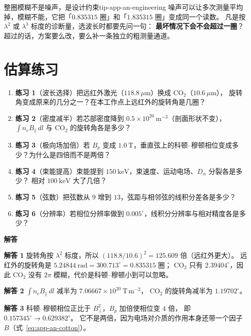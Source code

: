 \begin{tip}{整圈模糊不是噪声，是设计约束}{tip-app-an-engineering}
噪声可以让多次测量平均掉，模糊不能，它把「$0.835315$ 圈」和「$1.835315$ 圈」变成同一个读数。
凡是按 $\lambda^2$ 或 $\lambda^3$ 标度的诊断量，选波长时都要先问一句：
\textbf{最坏情况下会不会超过一圈}？
超过的话，方案要么改，要么补一条独立的粗测量通道。
\end{tip}


\section{估算练习}
\label{sec:app-an-problems}

\begin{enumerate}
\item \textbf{练习 1}（波长选择）把远红外激光（$118.8\ \mu\mathrm{m}$）换成 CO$_2$（$10.6\ \mu\mathrm{m}$），
旋转角变成原来的几分之一？在本工作点上远红外的旋转角是几圈？
\item \textbf{练习 2}（密度减半）若芯部密度降到 $0.5\times10^{20}\ \mathrm{m^{-3}}$（剖面形状不变），
$\int n_eB_\parallel\,dl$ 与 CO$_2$ 的旋转角各是多少？
\item \textbf{练习 3}（极向场加倍）若 $B_p$ 变成 $1.0\ \mathrm{T}$，垂直弦上的科顿--穆顿相位变成多少？为什么是四倍而不是两倍？
\item \textbf{练习 4}（束能提高）束能提到 $150\ \mathrm{keV}$，束速度、运动电场、$D_\alpha$ 分裂各是多少？
相对 $100\ \mathrm{keV}$ 大了几倍？
\item \textbf{练习 5}（弦数）把弦数从 $9$ 增到 $13$，弦距与相邻弦的线积分差各是多少？
\item \textbf{练习 6}（分辨率）若相位分辨率做到 $0.005^\circ$，线积分分辨率与相对精度各是多少？
\end{enumerate}

\textbf{解答}

\textbf{解答 1}
旋转角按 $\lambda^2$ 标度，所以
$(118.8/10.6)^2=125.609$ 倍（远红外更大）。
远红外的旋转角是 $5.24844\ \mathrm{rad}=300.713^\circ=0.835315$ 圈；
CO$_2$ 只有 $2.39404^\circ$，因此 CO$_2$ 没有 $2\pi$ 模糊，代价是科顿--穆顿小到可以忽略。

\textbf{解答 2}
$\int n_eB_\parallel\,dl$ 减半为 $7.06667\times10^{20}\ \mathrm{T\,m^{-2}}$，
CO$_2$ 的旋转角减半为 $1.19702^\circ$。

\textbf{解答 3}
科顿--穆顿相位正比于 $B_\perp^2$，$B_p$ 加倍使相位变 $4$ 倍，
即 $0.157345^\circ\rightarrow0.629382^\circ$。
它不是两倍，因为电场对介质的作用本身还带一个因子 $B$（式~\eqref{eq:app-an-cotton}）。

